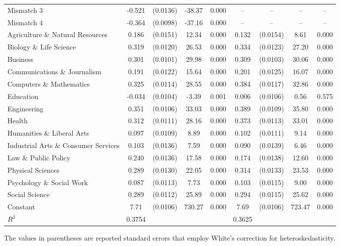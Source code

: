 \documentclass[11pt]{article}
\theoremstyle{definition}
\begin{document}
{\begin{center}
\begin{tabular}{l c c c c c c c c}
Mismatch 3 & -0.521 & (0.0136) & -38.37 & 0.000 & -- & -- & -- & -- \\
Mismatch 4 & -0.364 & (0.0098) & -37.16 & 0.000 & -- & -- & -- & -- \\
Agriculture \& Natural Resources & 0.186 & (0.0151) & 12.34 & 0.000 & 0.132 & (0.0154) & 8.61 & 0.000 \\
Biology \& Life Science & 0.319 & (0.0120) & 26.53 & 0.000 & 0.334 & (0.0123) & 27.20 & 0.000 \\
Business & 0.301 & (0.0101) & 29.98 & 0.000 & 0.309 & (0.0103) & 30.06 & 0.000 \\
Communications \& Journalism & 0.191 & (0.0122) & 15.64 & 0.000 & 0.201 & (0.0125) & 16.07 & 0.000 \\
Computers \& Mathematics & 0.325 & (0.0114) & 28.55 & 0.000  & 0.384 & (0.0117) & 32.86 & 0.000 \\
Education & -0.034 & (0.0104) & -3.39 & 0.001  & 0.006 & (0.0106) & 0.56 & 0.575 \\
Engineering & 0.351 & (0.0106) & 33.03 & 0.000 & 0.389 & (0.0109) & 35.80 & 0.000 \\
Health & 0.312 & (0.0111) & 28.16 & 0.000 & 0.373 & (0.0113) & 33.01 & 0.000 \\
Humanities \& Liberal Arts & 0.097 & (0.0109) & 8.89 & 0.000 & 0.102 & (0.0111) & 9.14 & 0.000 \\
Industrial Arts \& Consumer Services & 0.103 & (0.0136) & 7.59 & 0.000 & 0.090 & (0.0139) & 6.46 & 0.000 \\
Law \& Public Policy & 0.240 & (0.0136) & 17.58 & 0.000 & 0.174 & (0.0138) & 12.60 & 0.000 \\
Physical Sciences & 0.289 & (0.0130) & 22.05 & 0.000 & 0.314 & (0.0133) & 23.53 & 0.000 \\
Psychology \& Social Work & 0.087 & (0.0113) & 7.73 & 0.000 & 0.103 & (0.0115) & 9.00 & 0.000 \\
Social Science & 0.289 & (0.0112) & 25.89 & 0.000 & 0.294 & (0.0115) & 25.62 & 0.000 \\
Constant & 7.71 & (0.0106) & 730.27 & 0.000 & 7.69 & (0.0106) & 723.47 & 0.000 \\
\hline
$R^2$ & 0.3754 & & & & 0.3625 & & \\
\hline\hline
\end{tabular} 
\end{center}} 
\hspace{12mm} \small{The values in parentheses are reported standard errors that employ White's correction for heteroskedasticity.} 
\end{document}
